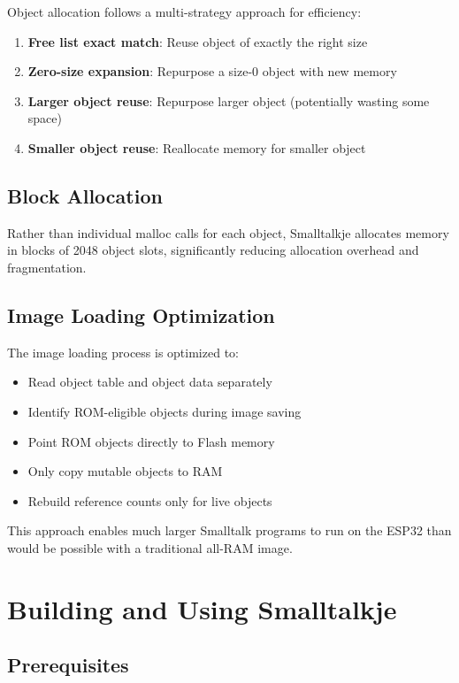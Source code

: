 \documentclass[12pt,a4paper]{report}
\begin{document}
Object allocation follows a multi-strategy approach for efficiency:

\begin{enumerate}
    \item \textbf{Free list exact match}: Reuse object of exactly the right size
    \item \textbf{Zero-size expansion}: Repurpose a size-0 object with new memory
    \item \textbf{Larger object reuse}: Repurpose larger object (potentially wasting some space)
    \item \textbf{Smaller object reuse}: Reallocate memory for smaller object
\end{enumerate}

\section{Block Allocation}

Rather than individual malloc calls for each object, Smalltalkje allocates memory in blocks of 2048 object slots, significantly reducing allocation overhead and fragmentation.

\section{Image Loading Optimization}

The image loading process is optimized to:

\begin{itemize}
    \item Read object table and object data separately
    \item Identify ROM-eligible objects during image saving
    \item Point ROM objects directly to Flash memory
    \item Only copy mutable objects to RAM
    \item Rebuild reference counts only for live objects
\end{itemize}

This approach enables much larger Smalltalk programs to run on the ESP32 than would be possible with a traditional all-RAM image.

\chapter{Building and Using Smalltalkje}

\section{Prerequisites}
\end{document}
